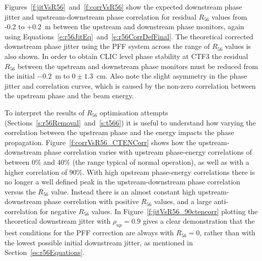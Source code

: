Figures~\ref{f:jitVsR56}~and~\ref{f:corrVsR56} show the expected downstream phase jitter and upstream-downstream phase correlation for residual \(R_{56}\) values from -0.2 to +0.2~m between the upstream and downstream phase monitors, again using Equations~\ref{e:r56JitEq}~and~\ref{e:r56CorrDefFinal}. The theoretical corrected downstream phase jitter using the PFF system across the range of \(R_{56}\) values is also shown. In order to obtain CLIC level phase stability at CTF3 the residual \(R_{56}\) between the upstream and downstream phase monitors must be reduced from the initial \(-0.2\)~m to \(0\pm1.3\)~cm. Also note the slight asymmetry in the phase jitter and correlation curves, which is caused by the non-zero correlation between the upstream phase and the beam energy. 


To interpret the results of \(R_{56}\) optimisation attempts (Sections~\ref{s:r56Removal}~and~\ref{s:t566}) it is useful to understand how varying the correlation between the upstream phase and the energy impacts the phase propagation. 
Figure~\ref{f:corrVsR56_CTENCorr} shows how the upstream-downstream phase correlation varies with upstream phase-energy correlations of between 0\% and 40\% (the range typical of normal operation), as well as with a higher correlation of 90\%. With high upstream phase-energy correlations there is no longer a well defined peak in the upstream-downstream phase correlation versus the \(R_{56}\) value. Instead there is an almost constant high upstream-downstream phase correlation with positive \(R_{56}\) values, and a large anti-correlation for negative \(R_{56}\) values. %
In Figure~\ref{f:jitVsR56_90ctencorr} plotting the theoretical downstream jitter with \(\rho_{up} = 0.9\) gives a clear demonstration that the best conditions for the PFF correction are always with \(R_{56} = 0\), rather than with the lowest possible initial downstream jitter, as mentioned in Section~\ref{ss:r56Equations}. %

